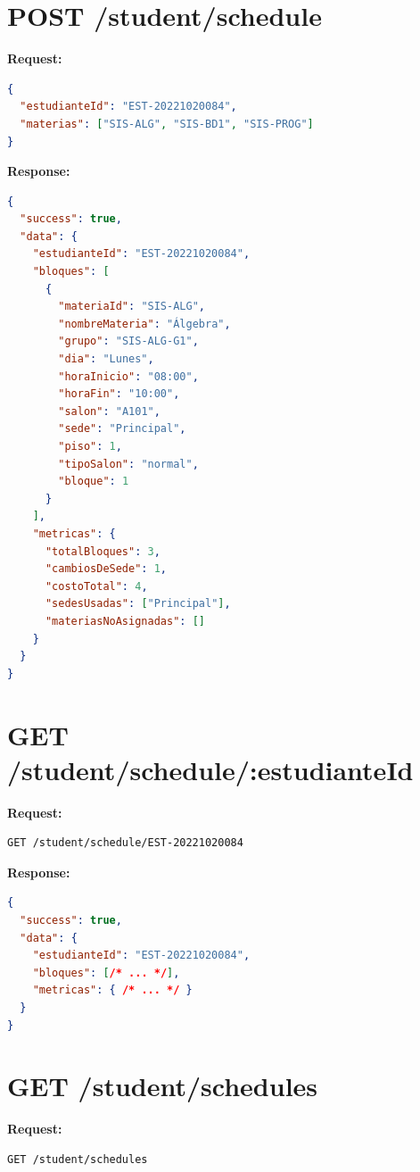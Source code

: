 \section{POST /student/schedule}

\textbf{Request:}
\begin{lstlisting}[language=JSON,caption={Body de /student/schedule}]
{
  "estudianteId": "EST-20221020084",
  "materias": ["SIS-ALG", "SIS-BD1", "SIS-PROG"]
}
\end{lstlisting}

\textbf{Response:}
\begin{lstlisting}[language=JSON,caption={Respuesta de /student/schedule}]
{
  "success": true,
  "data": {
    "estudianteId": "EST-20221020084",
    "bloques": [
      {
        "materiaId": "SIS-ALG",
        "nombreMateria": "Álgebra",
        "grupo": "SIS-ALG-G1",
        "dia": "Lunes",
        "horaInicio": "08:00",
        "horaFin": "10:00",
        "salon": "A101",
        "sede": "Principal",
        "piso": 1,
        "tipoSalon": "normal",
        "bloque": 1
      }
    ],
    "metricas": {
      "totalBloques": 3,
      "cambiosDeSede": 1,
      "costoTotal": 4,
      "sedesUsadas": ["Principal"],
      "materiasNoAsignadas": []
    }
  }
}
\end{lstlisting}

\section{GET /student/schedule/:estudianteId}

\textbf{Request:}
\begin{lstlisting}[language=Bash]
GET /student/schedule/EST-20221020084
\end{lstlisting}

\textbf{Response:}
\begin{lstlisting}[language=JSON,caption={Respuesta de /student/schedule/:estudianteId}]
{
  "success": true,
  "data": {
    "estudianteId": "EST-20221020084",
    "bloques": [/* ... */],
    "metricas": { /* ... */ }
  }
}
\end{lstlisting}

\section{GET /student/schedules}

\textbf{Request:}
\begin{lstlisting}[language=Bash]
GET /student/schedules
\end{lstlisting}

